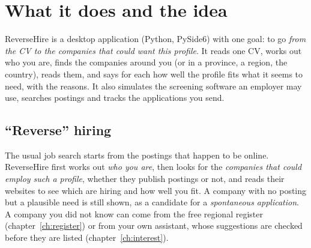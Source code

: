 \chapter{What it does and the idea}

ReverseHire is a desktop application (Python, PySide6) with one goal: to go \emph{from
the CV to the companies that could want this profile}. It reads one CV, works out who you are,
finds the companies around you (or in a province, a region, the country), reads them, and says for
each how well the profile fits what it seems to need, with the reasons. It also simulates the
screening software an employer may use, searches postings and tracks the applications you send.

\section{``Reverse'' hiring}
The usual job search starts from the postings that happen to be online. ReverseHire first works
out \emph{who you are}, then looks for the \emph{companies that could employ such a profile}, whether
they publish postings or not, and reads their websites to see which are hiring and how well you fit. A company with no posting but a plausible need is still
shown, as a candidate for a \emph{spontaneous application}. A company you did not know can come
from the free regional register (chapter~\ref{ch:register}) or from your own assistant, whose
suggestions are checked before they are listed (chapter~\ref{ch:interest}).

